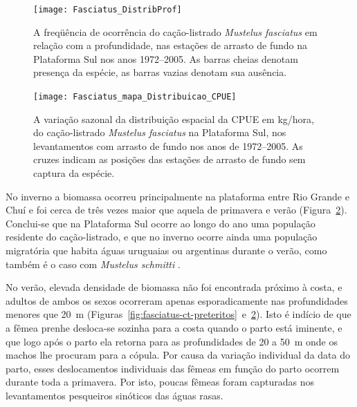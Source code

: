 \documentclass[a4paper,11pt,twoside,showtrims,onecolumn,openright,final]{memoir}
\begin{document}
%
%

\begin{figure}
\begin{center}
\texttt{[image: Fasciatus\_DistribProf]}
\end{center}
\caption[A freqüência de ocorrência do cação-listrado \emph{Mustelus fasciatus} 
	em relação com a profundidade, nas estações de arrasto de 
	fundo na Plataforma Sul nos anos 1972--2005]
	{A freqüência de ocorrência do cação-listrado \emph{Mustelus fasciatus}
	em relação com a profundidade, nas estações de arrasto de 
	fundo na Plataforma Sul nos anos 1972--2005. 
	As barras cheias denotam presença da espécie, 
	as barras vazias denotam sua ausência.}
\label{fig:fo-fasciatus-profundidade}
\end{figure}


%
%

\begin{figure}
\begin{center}
\texttt{[image: Fasciatus\_mapa\_Distribuicao\_CPUE]}
\end{center}
\caption[Variação sazonal da distribuição espacial da CPUE em kg/hora, do cação-listrado \emph{Mustelus fasciatus}]
	{A variação sazonal da distribuição espacial da CPUE em kg/hora, do cação-listrado \emph{Mustelus fasciatus} 
	 na Plataforma Sul, nos levantamentos com arrasto de fundo nos anos de 1972--2005. 
	 As cruzes indicam as posições das estações de arrasto de fundo sem captura da espécie.}
\label{fig:fasciatus-mapacpue}
\end{figure}


No inverno a biomassa ocorreu principalmente na plataforma entre Rio Grande e Chuí e foi
cerca de três vezes maior que aquela de primavera e verão (Figura~\ref{fig:fasciatus-mapacpue}).
Conclui-se que na Plataforma Sul ocorre ao longo do ano uma população 
residente do cação-listrado, e que no inverno ocorre ainda uma população migratória 
que habita águas uruguaias ou argentinas durante o verão, como também é o caso 
com \emph{Mustelus schmitti} \citep{vooren1997}. %

No verão, elevada densidade de biomassa não foi encontrada próximo à costa, 
e adultos de ambos os sexos ocorreram apenas esporadicamente nas profundidades 
menores que 20~m (Figuras~\ref{fig:fasciatus-ct-preteritos}~e~\ref{fig:fasciatus-mapacpue}).
Isto é indício de que a fêmea prenhe desloca-se sozinha para a costa quando 
o parto está iminente, e que logo após o parto ela retorna para as profundidades 
de 20 a 50~m onde os machos lhe procuram para a cópula.
Por causa da variação individual da data do parto, esses deslocamentos 
individuais das fêmeas em função do parto ocorrem durante toda a primavera. 
Por isto, poucas fêmeas foram capturadas nos levantamentos 
pesqueiros sinóticos das águas rasas.
\end{document}
